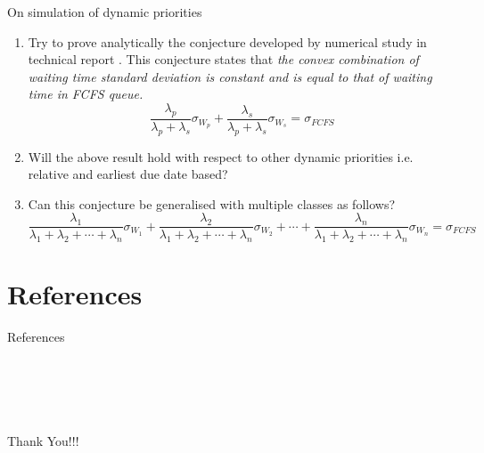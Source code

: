 \documentclass[compress, serif, onlymath, professionalfonts]{beamer}
\begin{document}
\begin{frame}
\begin{block}{On simulation of dynamic priorities}
\begin{enumerate}\scriptsize
\item Try to prove analytically the conjecture developed by numerical study in technical report \cite{bharat_tech}. This conjecture states that \textit{the convex combination of waiting time standard deviation is constant and is equal to that of waiting time in FCFS queue.}
$$\frac{\lambda_p}{\lambda_p + \lambda_s}\sigma_{W_p}+\frac{\lambda_s}{\lambda_p + \lambda_s}\sigma_{W_s} = \sigma_{FCFS}$$
\item Will the above result hold with respect to other dynamic priorities i.e. relative and earliest due date based?
\item Can this conjecture be generalised with multiple classes as follows?
\begin{equation}\nonumber
\dfrac{\lambda_1}{\lambda_1 + \lambda_2+ \cdots + \lambda_n}\sigma_{W_1} + \dfrac{\lambda_2}{\lambda_1 + \lambda_2+ \cdots + \lambda_n}\sigma_{W_2} +  \cdots + \dfrac{\lambda_n}{\lambda_1 + \lambda_2+ \cdots + \lambda_n}\sigma_{W_n} = \sigma_{FCFS}
\end{equation}
\end{enumerate}
\end{block}

\end{frame}
\section{References}
\begin{frame}[allowframebreaks]{References}	

\def\newblock{\hskip .11em plus .33em minus .07em}
\renewcommand\bibsection{\chapter{~}} %

\end{frame}

\section*{~}
\begin{frame}
\begin{center}
\Huge
Thank You!!!
\end{center}
\end{frame}
\end{document}
